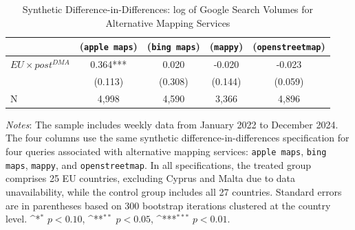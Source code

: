 \documentclass[11pt]{article}
\begin{document}
	
	
	
	\clearpage
	
	
	\begin{table}[h]
		\centering
		\def\sym#1{\ifmmode^{#1}\else\(^{#1}\)\fi}
		\caption{\label{tab:sdid_competitor} Synthetic Difference-in-Differences: log of Google Search Volumes for Alternative Mapping Services}
		\begin{threeparttable}
			\begin{tabular}{lcccc}
				\hline \noalign{\smallskip} 
				
				&(\texttt{apple maps})   &(\texttt{bing maps})   &(\texttt{mappy})   &(\texttt{openstreetmap})   \\
				\midrule
				$ EU \times post^{DMA} $ &       0.364***&       0.020   &      -0.020   &      -0.023   \\
				&     (0.113)   &     (0.308)   &     (0.144)   &     (0.059)   \\
				
				N                   &       4,998   &       4,590   &       3,366   &       4,896   \\
				\midrule
				
			\end{tabular}
			\begin{tablenotes}
				\item \footnotesize \emph{Notes}: The sample includes weekly data from January 2022 to December 2024. The four columns use the same synthetic difference-in-differences specification for four queries associated with alternative mapping services: \texttt{apple maps}, \texttt{bing maps}, \texttt{mappy}, and \texttt{openstreetmap}. In all specifications, the treated group comprises 25 EU countries, excluding Cyprus and Malta due to data unavailability, while the control group includes all 27 countries. Standard errors are in parentheses based on 300 bootstrap iterations clustered at the country level. \sym{*} \(p<0.10\), \sym{**} \(p<0.05\), \sym{***}  \(p<0.01\). 
			\end{tablenotes}
		\end{threeparttable}
	\end{table}
	
\end{document}
